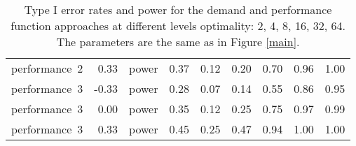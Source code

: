 \begin{table}[ht]
\begin{tabular}{lrlrrrrrr}
  performance~2 & 0.33 & power & 0.37 & 0.12 & 0.20 & 0.70 & 0.96 & 1.00 \\ 
  performance~3 & -0.33 & power & 0.28 & 0.07 & 0.14 & 0.55 & 0.86 & 0.95 \\ 
  performance~3 & 0.00 & power & 0.35 & 0.12 & 0.25 & 0.75 & 0.97 & 0.99 \\ 
  performance~3 & 0.33 & power & 0.45 & 0.25 & 0.47 & 0.94 & 1.00 & 1.00 \\ 
   \hline
\end{tabular}
\endgroup
\caption{Type I error rates and power for the demand 
             and performance function approaches at different
             levels optimality: 2, 4, 8, 16, 32, 64. The 
             parameters are the same as in Figure
             \ref{main}.} 
\label{main-table}
\end{table}
